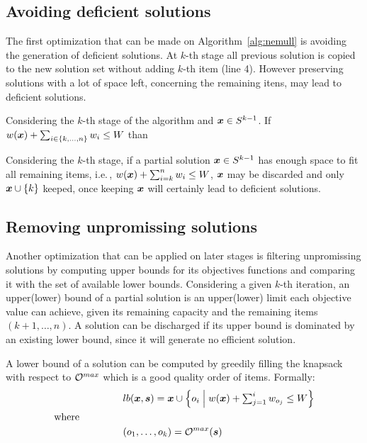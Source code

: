 \subsection{Avoiding deficient solutions}
\label{subsec:deficient}
The first optimization that can be made on Algorithm~\ref{alg:nemull} is
avoiding the generation of deficient solutions.
At $k$-th stage all previous solution is copied to the
new solution set without adding $k$-th item (line 4).
However preserving solutions with a lot of space left, concerning the remaining itens,
may lead to deficient solutions.

\begin{theorem}
   Considering the $k$-th stage of the algorithm and $\boldsymbol{x} \in S^{k-1}$.
   If $w(\boldsymbol{x}) + \sum_{i \in {\{k, \ldots, n\}}} w_i \leq W$ than
\end{theorem}

Considering the $k$-th stage, if a partial solution $\boldsymbol{x} \in S^{k-1}$ has enough
space to fit all remaining items, i.e.\,, $w(\boldsymbol{x}) + \sum_{i=k}^n w_i \leq W$,
$\boldsymbol{x}$ may be discarded and only $\boldsymbol{x} \cup \{k\}$ keeped, once
keeping $\boldsymbol{x}$ will certainly lead to deficient solutions.

\subsection{Removing unpromissing solutions}
\label{subsec:unpromissing}
Another optimization that can be applied on later stages is
filtering unpromissing solutions by computing upper bounds for its objectives
functions and comparing it with the set of available lower bounds.
Considering a given $k$-th iteration, an upper(lower) bound of a partial solution
is an upper(lower) limit each objective value can achieve,
given its remaining capacity and the remaining items $(k+1, \ldots, n)$.
A solution can be discharged if its upper bound is dominated by an existing lower bound, since it will generate no efficient solution.

A lower bound of a solution can be computed by greedily filling the
knapsack with respect to $\mathcal{O}^{max}$ which is a good quality order of items.
Formally:
\begin{align*}
    &lb(\boldsymbol{x}, \boldsymbol{s}) = \boldsymbol{x} \cup
      \left\{ o_i \;\middle|\; w(\boldsymbol{x}) + \textstyle\sum_{j=1}^i w_{o_j} \leq W \right\} \\
  \text{where} \phantom{mmmmm} \\
    &(o_1, \ldots, o_k) = \mathcal{O}^{max}(\boldsymbol{s}) \\
\end{align*}

